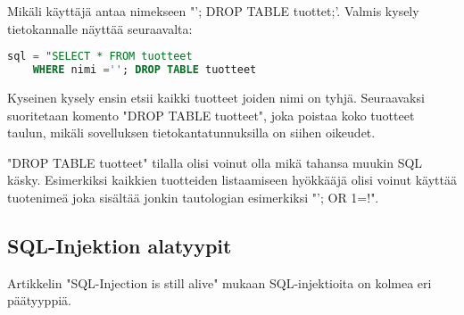 \documentclass[finnish]{tktltiki2}
\theoremstyle{definition}
\theoremstyle{remark}
\begin{document}
	Mikäli käyttäjä antaa nimekseen "'; DROP TABLE tuottet;'. Valmis kysely tietokannalle näyttää seuraavalta:
	
	\begin{lstlisting}[language=sql]
	sql = "SELECT * FROM tuotteet
	WHERE nimi =''; DROP TABLE tuotteet                             
	\end{lstlisting}
	
	Kyseinen kysely ensin etsii kaikki tuotteet joiden nimi on tyhjä. Seuraavaksi suoritetaan komento "DROP TABLE tuotteet", joka poistaa koko tuotteet taulun, mikäli sovelluksen tietokantatunnuksilla on siihen oikeudet. 
	
	"DROP TABLE tuotteet" tilalla olisi voinut olla mikä tahansa muukin SQL käsky. Esimerkiksi kaikkien tuotteiden listaamiseen hyökkääjä olisi voinut käyttää tuotenimeä joka sisältää jonkin tautologian esimerkiksi "'; OR 1=!".
	
	\subsection{SQL-Injektion alatyypit}
	Artikkelin "SQL-Injection is still alive"  mukaan SQL-injektioita on kolmea eri päätyyppiä\cite{still-alive}.
	
\end{document}
